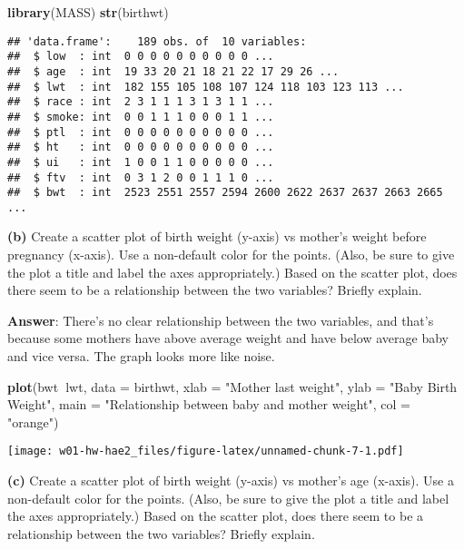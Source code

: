 \documentclass[]{article}
\newenvironment{Shaded}{\begin{snugshade}}{\end{snugshade}}
\newcommand{\KeywordTok}[1]{\textcolor[rgb]{0.13,0.29,0.53}{\textbf{#1}}}
\newcommand{\DataTypeTok}[1]{\textcolor[rgb]{0.13,0.29,0.53}{#1}}
\newcommand{\StringTok}[1]{\textcolor[rgb]{0.31,0.60,0.02}{#1}}
\newcommand{\OperatorTok}[1]{\textcolor[rgb]{0.81,0.36,0.00}{\textbf{#1}}}
\newcommand{\NormalTok}[1]{#1}
\begin{document}
\begin{Shaded}
\begin{Highlighting}[]
\KeywordTok{library}\NormalTok{(MASS)}
\KeywordTok{str}\NormalTok{(birthwt)}
\end{Highlighting}
\end{Shaded}

\begin{verbatim}
## 'data.frame':    189 obs. of  10 variables:
##  $ low  : int  0 0 0 0 0 0 0 0 0 0 ...
##  $ age  : int  19 33 20 21 18 21 22 17 29 26 ...
##  $ lwt  : int  182 155 105 108 107 124 118 103 123 113 ...
##  $ race : int  2 3 1 1 1 3 1 3 1 1 ...
##  $ smoke: int  0 0 1 1 1 0 0 0 1 1 ...
##  $ ptl  : int  0 0 0 0 0 0 0 0 0 0 ...
##  $ ht   : int  0 0 0 0 0 0 0 0 0 0 ...
##  $ ui   : int  1 0 0 1 1 0 0 0 0 0 ...
##  $ ftv  : int  0 3 1 2 0 0 1 1 1 0 ...
##  $ bwt  : int  2523 2551 2557 2594 2600 2622 2637 2637 2663 2665 ...
\end{verbatim}

\textbf{(b)} Create a scatter plot of birth weight (y-axis) vs mother's
weight before pregnancy (x-axis). Use a non-default color for the
points. (Also, be sure to give the plot a title and label the axes
appropriately.) Based on the scatter plot, does there seem to be a
relationship between the two variables? Briefly explain.

\textbf{Answer}: There's no clear relationship between the two
variables, and that's because some mothers have above average weight and
have below average baby and vice versa. The graph looks more like noise.

\begin{Shaded}
\begin{Highlighting}[]
\KeywordTok{plot}\NormalTok{(bwt}\OperatorTok{~}\NormalTok{lwt, }\DataTypeTok{data =}\NormalTok{ birthwt,}
     \DataTypeTok{xlab =} \StringTok{"Mother last weight"}\NormalTok{,}
     \DataTypeTok{ylab =} \StringTok{"Baby Birth Weight"}\NormalTok{,}
     \DataTypeTok{main =} \StringTok{"Relationship between baby and mother weight"}\NormalTok{,}
     \DataTypeTok{col =} \StringTok{"orange"}\NormalTok{)}
\end{Highlighting}
\end{Shaded}

\texttt{[image: w01-hw-hae2\_files/figure-latex/unnamed-chunk-7-1.pdf]}

\textbf{(c)} Create a scatter plot of birth weight (y-axis) vs mother's
age (x-axis). Use a non-default color for the points. (Also, be sure to
give the plot a title and label the axes appropriately.) Based on the
scatter plot, does there seem to be a relationship between the two
variables? Briefly explain.
\end{document}
